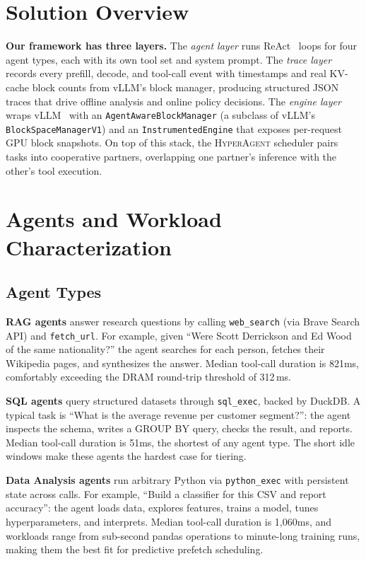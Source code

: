 \documentclass[10pt,twocolumn]{article}
\begin{document}
\section{Solution Overview}

\textbf{Our framework has three layers.} The \emph{agent layer} runs ReAct~\cite{yao2023react} loops for four agent types, each with its own tool set and system prompt. The \emph{trace layer} records every prefill, decode, and tool-call event with timestamps and real KV-cache block counts from vLLM's block manager, producing structured JSON traces that drive offline analysis and online policy decisions. The \emph{engine layer} wraps vLLM~\cite{kwon2023vllm} with an \texttt{AgentAwareBlockManager} (a subclass of vLLM's \texttt{BlockSpaceManagerV1}) and an \texttt{InstrumentedEngine} that exposes per-request GPU block snapshots. On top of this stack, the \textsc{HyperAgent} scheduler pairs tasks into cooperative partners, overlapping one partner's inference with the other's tool execution.

\section{Agents and Workload Characterization}

\subsection{Agent Types}

\textbf{RAG agents} answer research questions by calling \texttt{web\_search} (via Brave Search API) and \texttt{fetch\_url}. For example, given ``Were Scott Derrickson and Ed Wood of the same nationality?'' the agent searches for each person, fetches their Wikipedia pages, and synthesizes the answer. Median tool-call duration is 821ms, comfortably exceeding the DRAM round-trip threshold of 312\,ms.

\textbf{SQL agents} query structured datasets through \texttt{sql\_exec}, backed by DuckDB. A typical task is ``What is the average revenue per customer segment?'': the agent inspects the schema, writes a GROUP BY query, checks the result, and reports. Median tool-call duration is 51ms, the shortest of any agent type. The short idle windows make these agents the hardest case for tiering.

\textbf{Data Analysis agents} run arbitrary Python via \texttt{python\_exec} with persistent state across calls. For example, ``Build a classifier for this CSV and report accuracy'': the agent loads data, explores features, trains a model, tunes hyperparameters, and interprets. Median tool-call duration is 1,060ms, and workloads range from sub-second pandas operations to minute-long training runs, making them the best fit for predictive prefetch scheduling.
\end{document}

